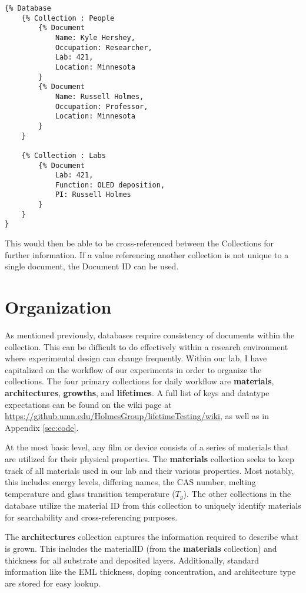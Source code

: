 \documentclass[../thesis.tex]{subfiles}
\begin{document}
\begin{lstlisting}
{% Database 
    {% Collection : People
        {% Document
            Name: Kyle Hershey,
            Occupation: Researcher,
            Lab: 421,
            Location: Minnesota
        }
        {% Document
            Name: Russell Holmes,
            Occupation: Professor,
            Location: Minnesota
        }
    }

    {% Collection : Labs
        {% Document
            Lab: 421,
            Function: OLED deposition,
            PI: Russell Holmes
        }
    }
}

\end{lstlisting}

This would then be able to be cross-referenced between the Collections for further information.
If a value referencing another collection is not unique to a single document, the Document ID can be used.


\section{Organization}

As mentioned previously, databases require consistency of documents within the collection.
This can be difficult to do effectively within a research environment where experimental design can change frequently.
Within our lab, I have capitalized on the workflow of our experiments in order to organize the collections.
The four primary collections for daily workflow are \textbf{materials}, \textbf{architectures}, \textbf{growths}, and \textbf{lifetimes}.
A full list of keys and datatype expectations can be found on the wiki page at \url{https://github.umn.edu/HolmesGroup/lifetimeTesting/wiki}, as well as in Appendix \ref{sec:code}.

At the most basic level, any film or device consists of a series of materials that are utilized for their physical properties.
The \textbf{materials} collection seeks to keep track of all materials used in our lab and their various properties.  
Most notably, this includes energy levels, differing names, the CAS number, melting temperature and glass transition temperature ($T_g$).
The other collections in the database utilize the material ID from this collection to uniquely identify materials for searchability and cross-referencing purposes.

The \textbf{architectures} collection captures the information required to describe what is grown.
This includes the materialID (from the \textbf{materials} collection) and thickness for all substrate and deposited layers.  
Additionally, standard information like the EML thickness, doping concentration, and architecture type are stored for easy lookup.
\end{document}
